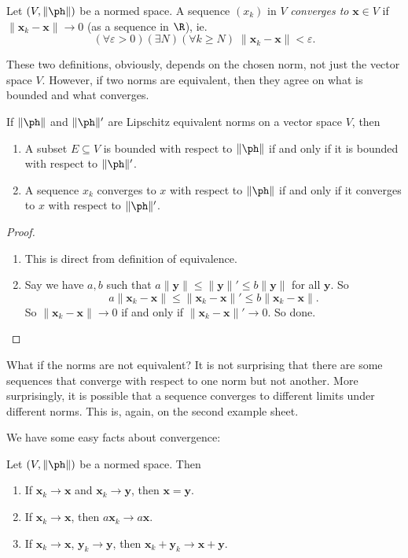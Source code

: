 \documentclass[a4paper]{article}
\begin{document}
\begin{defi}
  Let $(V, \|\ph\|)$ be a normed space. A sequence $(x_k)$ in $V$ \emph{converges to} $\mathbf{x} \in V$ if $\|\mathbf{x}_k - \mathbf{x}\| \to 0$ (as a sequence in $\R$), ie.
  \[
    (\forall \varepsilon > 0)(\exists N)(\forall k \geq N)\; \|\mathbf{x}_k - \mathbf{x}\| < \varepsilon.
  \]
\end{defi}
These two definitions, obviously, depends on the chosen norm, not just the vector space $V$. However, if two norms are equivalent, then they agree on what is bounded and what converges.
\begin{prop}
  If $\|\ph \|$ and $\|\ph \|'$ are Lipschitz equivalent norms on a vector space $V$, then
  \begin{enumerate}
    \item A subset $E\subseteq V$ is bounded with respect to $\|\ph \|$ if and only if it is bounded with respect to $\|\ph \|'$.
    \item A sequence $x_k$ converges to $x$ with respect to $\|\ph \|$ if and only if it converges to $x$ with respect to $\|\ph \|'$.
  \end{enumerate}
\end{prop}

\begin{proof}\leavevmode
  \begin{enumerate}
    \item This is direct from definition of equivalence.
    \item Say we have $a, b$ such that $a\|\mathbf{y}\| \leq \|\mathbf{y}\|' \leq b\|\mathbf{y}\|$ for all $\mathbf{y}$. So
      \[
        a\|\mathbf{x}_k - \mathbf{x}\| \leq \|\mathbf{x}_k - \mathbf{x}\|' \leq b\|\mathbf{x}_k - \mathbf{x}\|.
      \]
      So $\|\mathbf{x}_k - \mathbf{x}\| \to 0$ if and only if $\|\mathbf{x}_k - \mathbf{x}\|' \to 0$. So done.
  \end{enumerate}
\end{proof}
What if the norms are not equivalent? It is not surprising that there are some sequences that converge with respect to one norm but not another. More surprisingly, it is possible that a sequence converges to different limits under different norms. This is, again, on the second example sheet.

We have some easy facts about convergence:
\begin{prop}
  Let $(V, \|\ph \|)$ be a normed space. Then
  \begin{enumerate}
    \item If $\mathbf{x}_k \to \mathbf{x}$ and $\mathbf{x}_k \to \mathbf{y}$, then $\mathbf{x} = \mathbf{y}$.
    \item If $\mathbf{x}_k \to \mathbf{x}$, then $a\mathbf{x}_k \to a\mathbf{x}$.
    \item If $\mathbf{x}_k \to \mathbf{x}$, $\mathbf{y}_k \to \mathbf{y}$, then $\mathbf{x}_k + \mathbf{y}_k \to \mathbf{x} + \mathbf{y}$.
  \end{enumerate}
\end{prop}
\end{document}
